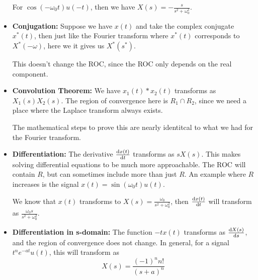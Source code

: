 \begin{itemize}
		For \( \cos(- \omega_0 t) u(-t) \), then we have \( X(s) = -\frac{s}{s^2 + \omega_0^2} \). 

	\item \textbf{Conjugation:} Suppose we have \( x(t) \) and take the complex conjugate \( x^{*}(t) \), 
		then just like the Fourier transform where \( x^{*}(t) \) corresponds to \( X^{*}(-\omega) \), here 
		we it gives us \( X^{*}(s^{*}) \).  

		This doesn't change the ROC, since the ROC only depends on the real component. 


	\item \textbf{Convolution Theorem:} We have \( x_1(t) * x_2(t)  \) transforms as \( X_1(s) X_2(s) \). The region
		of convergence here is \( R_1 \cap R_2 \), since we need a place where the Laplace transform 
		always exists. 

		The mathematical steps to prove this are nearly identitcal to what we had for the Fourier transform.
	\item \textbf{Differentiation:} The derivative \( \dv{x(t)}{t} \) transforms as \( s X(s) \). This makes 
		solving differential equations to be much more approachable. The ROC will contain \( R \), but 
		can sometimes include more than just \( R \). An example where \( R \) increases 
		is the signal \( x(t) = \sin(\omega_0 t) u(t) \). 

		We know that \( x(t) \) transforms to \( X(s) = \frac{\omega_0}{s^2 + \omega_0^2} \), then 
		\( \dv{x(t)}{t}  \) will transform as \( \frac{\omega_0s}{s^2 + \omega_0^2} \). 
	\item \textbf{Differentiation in s-domain:} The function \( -t x(t) \) transforms as 
		\( \dv{X(s)}{s} \), and the region of convergence does not change. In general, for a 
		signal \( t^n e^{-at} u(t)\), this will transform as 
		\[
		X(s) = \frac{(-1)^{n} n!}{(s + a)^{n}}
		\] 
\end{itemize}





